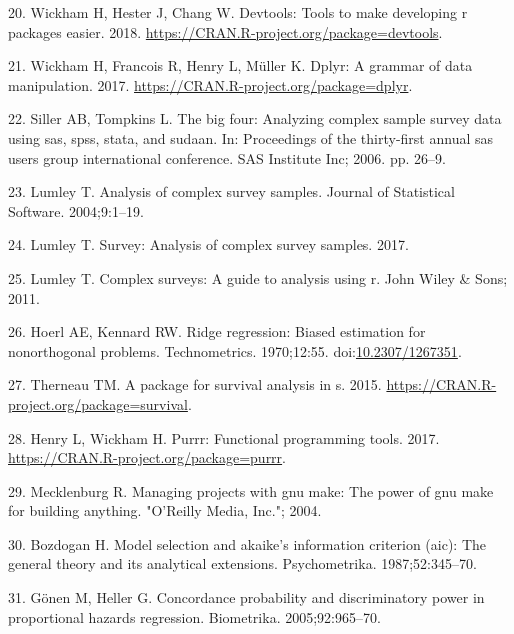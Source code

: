 \documentclass[12pt,oneside]{reedthesis}
\theoremstyle{definition}
\theoremstyle{definition}
\theoremstyle{definition}
\theoremstyle{remark}
\begin{document}
\leavevmode\hypertarget{ref-devtools_2018}{}%
20. Wickham H, Hester J, Chang W. Devtools: Tools to make developing r
packages easier. 2018.
\url{https://CRAN.R-project.org/package=devtools}.

\leavevmode\hypertarget{ref-dplyr_2017}{}%
21. Wickham H, Francois R, Henry L, Müller K. Dplyr: A grammar of data
manipulation. 2017. \url{https://CRAN.R-project.org/package=dplyr}.

\leavevmode\hypertarget{ref-Siller_2006}{}%
22. Siller AB, Tompkins L. The big four: Analyzing complex sample survey
data using sas, spss, stata, and sudaan. In: Proceedings of the
thirty-first annual sas users group international conference. SAS
Institute Inc; 2006. pp. 26--9.

\leavevmode\hypertarget{ref-Lumley_2004}{}%
23. Lumley T. Analysis of complex survey samples. Journal of Statistical
Software. 2004;9:1--19.

\leavevmode\hypertarget{ref-survey_2017}{}%
24. Lumley T. Survey: Analysis of complex survey samples. 2017.

\leavevmode\hypertarget{ref-Lumley_2011}{}%
25. Lumley T. Complex surveys: A guide to analysis using r. John Wiley
\& Sons; 2011.

\leavevmode\hypertarget{ref-Hoerl_1970}{}%
26. Hoerl AE, Kennard RW. Ridge regression: Biased estimation for
nonorthogonal problems. Technometrics. 1970;12:55.
doi:\href{https://doi.org/10.2307/1267351}{10.2307/1267351}.

\leavevmode\hypertarget{ref-survival_2015}{}%
27. Therneau TM. A package for survival analysis in s. 2015.
\url{https://CRAN.R-project.org/package=survival}.

\leavevmode\hypertarget{ref-purrr_2017}{}%
28. Henry L, Wickham H. Purrr: Functional programming tools. 2017.
\url{https://CRAN.R-project.org/package=purrr}.

\leavevmode\hypertarget{ref-Mecklenburg_2004}{}%
29. Mecklenburg R. Managing projects with gnu make: The power of gnu
make for building anything. "O'Reilly Media, Inc."; 2004.

\leavevmode\hypertarget{ref-Bozdogan_1987}{}%
30. Bozdogan H. Model selection and akaike's information criterion
(aic): The general theory and its analytical extensions. Psychometrika.
1987;52:345--70.

\leavevmode\hypertarget{ref-Gonen_2005}{}%
31. Gönen M, Heller G. Concordance probability and discriminatory power
in proportional hazards regression. Biometrika. 2005;92:965--70.
\end{document}
